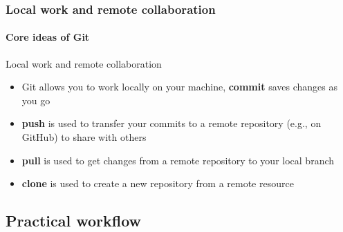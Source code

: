 \documentclass[aspectratio=169,dvipsnames]{beamer}
\begin{document}
\begin{frame}


\end{frame}

\begin{frame}
        \frametitle{Local work and remote collaboration}
        \framesubtitle{Core ideas of Git}
        \begin{block}{Local work and remote collaboration}
            \begin{itemize}
                \item Git allows you to work locally on your machine, \textbf{commit} saves changes as you go
                \item \textbf{push} is used to transfer your commits to a remote repository (e.g., on GitHub) to share with others
                \item \textbf{pull} is used to get changes from a remote repository to your local branch
                \item \textbf{clone} is used to create a new repository from a remote resource
            \end{itemize}
        \end{block}
\end{frame}

\subsection{Practical workflow}
\end{document}
